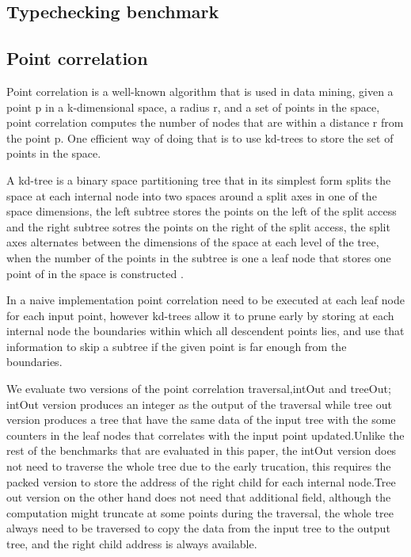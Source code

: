 \documentclass[preprint,10pt,nocopyrightspace,nonatbib]{./bibs/sigplanconf}
\begin{document}


\subsection{Typechecking benchmark}


\subsection{Point correlation}
Point correlation  is a well-known algorithm that is used in data mining\cite{capnproto},
given a point p in a k-dimensional space, a radius r, and a set of points in the space,
point correlation computes the number of nodes that are within a distance r from the point p.
One efficient way of doing that is to use kd-trees  to store the set of points in the space\cite{capnproto}. 

A kd-tree is a binary space partitioning tree that in its simplest form  splits the space at each internal node into two spaces
around a split axes in one of the space dimensions, the left subtree stores the points on the left of the split access
and the right subtree sotres the points on the right of the split access, the split axes alternates between the dimensions of
the space at each level of the tree, when the number of the points in the subtree is one a 
leaf node that stores one point of in the space is constructed .

In a naive implementation point correlation need to be executed at each leaf node for each input point, however kd-trees 
allow  it to  prune early by storing at each internal node the boundaries within which all descendent points lies,
and use that information to skip a subtree if the given point is far enough from the boundaries.

We evaluate two versions of the point correlation traversal,intOut and treeOut; intOut version
produces an integer as the output of the traversal while  tree out version  produces a tree
that have the same data of the input tree with the some counters in the leaf nodes that 
correlates with the input point updated.Unlike  the rest of the benchmarks that are  evaluated in this paper,
 the intOut version does not need to traverse the whole tree due to the early trucation, this requires
the packed version to store the address of the right child for each internal node.Tree out version on the other hand 
does not need that additional field, although the computation might  truncate at some points during the traversal, 
the whole tree always need to be traversed to copy the data from the input tree to the output tree, 
and the right child address is always available.
\end{document}
